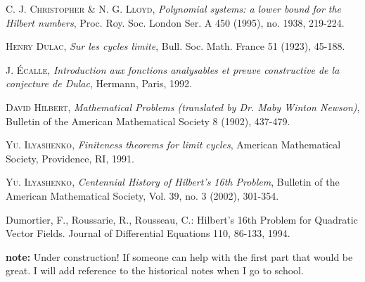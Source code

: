\documentclass[12pt]{article}
\begin{document}
\begin{thebibliography}{10}
{\scshape C. J. Christopher \& N. G. Lloyd}, \emph{Polynomial systems: a lower bound for the
Hilbert numbers}, Proc. Roy. Soc. London Ser. A 450 (1995), no. 1938, 219-224.

{\scshape Henry Dulac}, \emph{Sur les cycles limite}, Bull. Soc. Math. France
51 (1923), 45-188.

{\scshape J. \'Ecalle}, \emph{Introduction aux fonctions analysables et preuve
constructive de la conjecture de Dulac}, Hermann, Paris, 1992.

{\scshape David Hilbert}, \emph{Mathematical Problems (translated by Dr. Maby Winton Newson)}, Bulletin of the American Mathematical Society 8 (1902), 437-479.

{\scshape Yu. Ilyashenko}, \emph{Finiteness theorems for limit cycles}, 
American Mathematical Society, Providence, RI, 1991. 

{\scshape Yu. Ilyashenko}, \emph{Centennial History of Hilbert's 16th Problem}, Bulletin of the American Mathematical Society, Vol. 39, no. 3 (2002), 301-354. 

 Dumortier, F., Roussarie, R., Rousseau, C.: Hilbert's 16th Problem for Quadratic Vector Fields. Journal of Differential Equations 110, 86-133, 1994.
\end{thebibliography}

\textbf{note:}
Under construction! If someone can help with the first part that would be great. I will add reference to the historical notes when I go to school.
\end{document}
